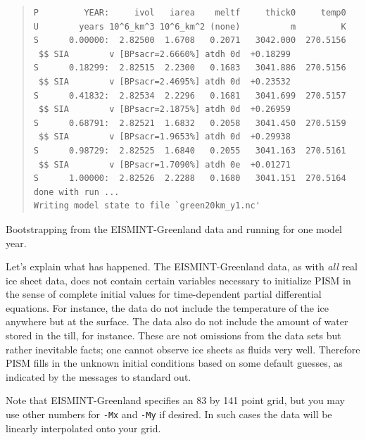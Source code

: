 \documentclass[11pt,final]{amsart}
\begin{document}
\begin{table}
\begin{quote}
\begin{verbatim}
P         YEAR:     ivol   iarea    meltf     thick0     temp0
U        years 10^6_km^3 10^6_km^2 (none)          m         K
S      0.00000:  2.82500  1.6708   0.2071   3042.000  270.5156
 $$ SIA        v [BPsacr=2.6660%] atdh 0d  +0.18299
S      0.18299:  2.82515  2.2300   0.1683   3041.886  270.5156
 $$ SIA        v [BPsacr=2.4695%] atdh 0d  +0.23532
S      0.41832:  2.82534  2.2296   0.1681   3041.699  270.5157
 $$ SIA        v [BPsacr=2.1875%] atdh 0d  +0.26959
S      0.68791:  2.82521  1.6832   0.2058   3041.450  270.5159
 $$ SIA        v [BPsacr=1.9653%] atdh 0d  +0.29938
S      0.98729:  2.82525  1.6840   0.2055   3041.163  270.5161
 $$ SIA        v [BPsacr=1.7090%] atdh 0e  +0.01271
S      1.00000:  2.82526  2.2288   0.1680   3041.151  270.5164
done with run ... 
Writing model state to file `green20km_y1.nc'
\end{verbatim}
\end{quote}
\normalsize
\bigskip

\caption{Bootstrapping from the EISMINT-Greenland data and running for one model year.}
\end{table}

Let's explain what has happened.  The EISMINT-Greenland data, as with \emph{all} real ice sheet data, does not contain certain variables necessary to initialize PISM in the sense of complete initial values for time-dependent partial differential equations.  For instance, the data do not include the temperature of the ice anywhere but at the surface.  The data also do not include the amount of water stored in the till, for instance.  These are not omissions from the data sets but rather inevitable facts; one cannot observe ice sheets as fluids very well.  Therefore PISM fills in the unknown initial conditions based on some default guesses, as indicated by the messages to standard out.

Note that EISMINT-Greenland specifies an 83 by 141 point grid, but you may use other numbers for \verb|-Mx| and \verb|-My| if desired.  In such cases the data will be linearly interpolated onto your grid.

\end{document}
